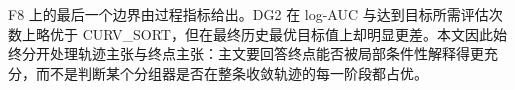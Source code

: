 F8 上的最后一个边界由过程指标给出。DG2 在 log-AUC 与达到目标所需评估次数上略优于 CURV\_SORT，但在最终历史最优目标值上却明显更差。本文因此始终分开处理轨迹主张与终点主张：主文要回答终点能否被局部条件性解释得更充分，而不是判断某个分组器是否在整条收敛轨迹的每一阶段都占优。